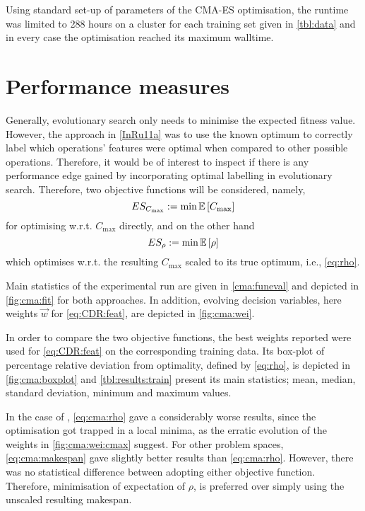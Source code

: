 Using standard set-up of parameters of the CMA-ES optimisation, the runtime was 
limited to 288 hours on a cluster for each training set given in 
\cref{tbl:data} and in every case the optimisation reached its maximum walltime.

\section{Performance measures}\label{sec:expr:measure}
Generally, evolutionary search only needs to minimise the expected fitness 
value. However, the  approach in \cref{InRu11a} was to use the known optimum to 
correctly label which operations' features were optimal when compared to other 
possible operations. Therefore, it would be of interest to inspect if there is 
any performance edge gained by incorporating optimal labelling in evolutionary 
search. Therefore, two objective functions will be considered, namely, 
\begin{equation}\label{eq:cma:makespan}
	ES_{C_{\max}} := \min \Exp{C_{\max}} 
\end{equation}
for optimising w.r.t. $C_{\max}$ directly, and on the other hand
\begin{equation}\label{eq:cma:rho}
	ES_{\rho} := \min \Exp{\rho} 
\end{equation} 
which optimises w.r.t. the resulting $C_{\max}$ scaled to its true optimum, 
i.e., \cref{eq:rho}.

Main statistics of the experimental run are given in \cref{cma:funeval} and 
depicted in \cref{fig:cma:fit} for both approaches. In addition, evolving 
decision variables, here weights $\vec{w}$ for \cref{eq:CDR:feat}, are 
depicted in \cref{fig:cma:wei}. 

In order to compare the two objective functions, the best weights reported were 
used for \cref{eq:CDR:feat} on the corresponding training data. Its 
box-plot of percentage relative deviation from optimality, defined by 
\cref{eq:rho}, is depicted in \cref{fig:cma:boxplot} and 
\cref{tbl:results:train} present its main statistics; mean, median, standard 
deviation, minimum and maximum values.

In the case of , \cref{eq:cma:rho} gave a considerably worse 
results, since the optimisation got trapped in a local minima, as the erratic 
evolution of the weights in \cref{fig:cma:wei:cmax} suggest.
For other problem spaces, \cref{eq:cma:makespan} gave slightly better results 
than \cref{eq:cma:rho}. However, there was no statistical difference between 
adopting either objective function. Therefore, minimisation of expectation of 
$\rho$, is preferred over simply using the unscaled resulting makespan. 


